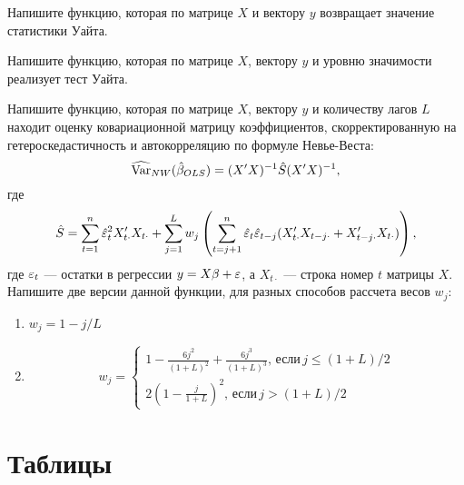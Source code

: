 \documentclass[pdftex,11pt,openany]{book}\usepackage[]{graphicx}\usepackage[]{color}
\begin{document}
\begin{solution}
\end{solution}


\begin{problem}
Напишите функцию, которая по матрице $X$ и вектору $y$ возвращает
значение статистики Уайта.
\end{problem}

\begin{solution}
\end{solution}


\begin{problem}
Напишите функцию, которая по матрице $X$, вектору $y$ и уровню
значимости реализует тест Уайта.
\end{problem}

\begin{solution}
\end{solution}


\begin{problem}
Напишите функцию, которая по матрице $X$, вектору $y$ и количеству лагов $L$ находит оценку ковариационной матрицу  коэффициентов, скорректированную на гетероскедастичность и автокорреляцию по формуле Невье-Веста:
\[
\widehat{\operatorname{Var}}_{NW}(\hat{\beta}_{OLS})=(X'X)^{-1}\hat{S}(X'X)^{-1},
\]
где
\[
\hat{S}=\sum_{t=1}^{n}\hat{\varepsilon}_t^2 X_{t\cdot}'X_{t\cdot}+
                     \sum_{j=1}^L w_j \left(\sum_{t=j+1}^n  \hat{\varepsilon}_t \hat{\varepsilon}_{t-j}(X_{t\cdot}'X_{t-j\cdot}+X_{t-j\cdot}'X_{t\cdot})  \right),
\]
где $\varepsilon_t$ --- остатки в регрессии $y=X\beta+\varepsilon$, а $X_{t\cdot}$ --- строка номер $t$ матрицы $X$.
Напишите две версии данной функции, для разных способов рассчета весов $w_j$:
\begin{enumerate}
\item $w_j=1-j/L$
\item 
\[
w_j=\begin{cases}
1-\frac{6j^2}{(1+L)^2}+\frac{6j^3}{(1+L)^3},\, \text{если}\,  j\leq (1+L)/2 \\
2\left(1-\frac{j}{1+L} \right)^2,\, \text{если}\, j>(1+L)/2
\end{cases}
\]
\end{enumerate}
\end{problem}

\begin{solution}
\end{solution}




\restorechapter
\chapter{Таблицы}
\end{document}
